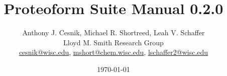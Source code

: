 

\title{Proteoform Suite Manual 0.2.0}
\author{Anthony J. Cesnik, Michael R. Shortreed, Leah V. Schaffer \\[2ex]
	Lloyd M. Smith Research Group \\[2ex]
	\href{mailto:cesnik@wisc.edu}{cesnik@wisc.edu}, \href{mailto:mshort@chem.wisc.edu}{mshort@chem.wisc.edu}, \href{mailto:lschaffer2@wisc.edu}{lschaffer2@wisc.edu}}
\date{\today}



\maketitle

\pagebreak

{}
\tableofcontents
\pagebreak


\pagebreak

\pagebreak

\pagebreak

\pagebreak

\pagebreak

\pagebreak

\pagebreak

\pagebreak

\pagebreak

\pagebreak

\pagebreak



\pagebreak
{}
\printbibliography


